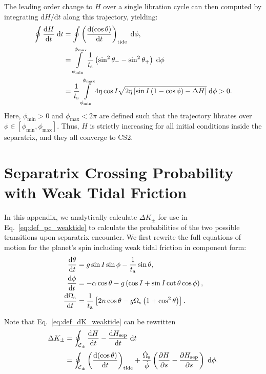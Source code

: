 \documentclass[
        fleqn,
        usenatbib,
    ]{mnras}
\newcommand*{\rd}[2]{\frac{\mathrm{d}#1}{\mathrm{d}#2}}
\newcommand*{\pd}[2]{\frac{\partial#1}{\partial#2}}
\newcommand*{\rdil}[2]{\mathrm{d}#1/\mathrm{d}#2}
\newcommand*{\p}[1]{\left(#1\right)}
\newcommand*{\s}[1]{\left[#1\right]}
\begin{document}
The leading order change to $H$ over a single libration cycle can then computed by
integrating $\rdil{H}{t}$ along this trajectory, yielding:
\begin{align}
    \oint \rd{H}{t}\;\mathrm{d}t
        &= \oint \p{\rd{(\cos \theta)}{t}}_{\rm tide}
            \;\mathrm{d}\phi,\nonumber\\
        &= \int\limits_{\phi_{\min}}^{\phi_{\max}}
                \frac{1}{t_{\rm s}}
                \p{\sin^2\theta_- - \sin^2\theta_+} \;\mathrm{d}\phi\nonumber\\
        &= \frac{1}{t_{\rm s}}
            \int\limits_{\phi_{\min}}^{\phi_{\max}}
                4\eta \cos I \sqrt{2\eta\s{\sin I\p{1 - \cos \phi} - \Delta H}}
                \;\mathrm{d}\phi > 0.
\end{align}
Here, $\phi_{\min} > 0$ and $\phi_{\max} < 2\pi$ are defined such that the
trajectory librates over $\phi \in \s{\phi_{\min}, \phi_{\max}}$. Thus, $H$ is
strictly increasing for all initial conditions inside the separatrix, and they
all converge to CS2.

\section{Separatrix Crossing Probability with Weak Tidal Friction
}\label{app:sep_crossing_dynamics}

In this appendix, we analytically calculate $\Delta K_{\pm}$ for use in
Eq.~\eqref{eq:def_pc_weaktide} to calculate the probabilities of the two
possible transitions upon separatrix encounter. We first rewrite the full
equations of motion for the planet's spin including weak tidal friction in
component form:
\begin{align}
    \rd{\theta}{t} &= g\sin I \sin \phi -
        \frac{1}{t_{\rm a}} \sin \theta,\label{eq:ds_fullq}\\
    \rd{\phi}{t} &= -\alpha\cos\theta
        - g\p{\cos I + \sin I \cot \theta \cos \phi}\label{eq:ds_fullphi},\\
    \rd{\Omega_{\rm s}}{t}
        &= \frac{1}{t_{\rm a}} \s{2n \cos \theta
            - g\Omega_{\rm s}\p{1 + \cos^2\theta}}\label{eq:ds_fulls}.
\end{align}

Note that Eq.~\eqref{eq:def_dK_weaktide} can be rewritten
\begin{align}
    \Delta K_{\pm} &= \oint_{\mathcal{C}_{\pm}} \rd{H}{t}
        - \rd{H_{\rm sep}}{t}\;\mathrm{d}t
        \nonumber\\
        &= \oint_{\mathcal{C}_{\pm}}
           \p{\rd{(\cos\theta)}{t}}_{\rm tide}
            + \frac{\dot{\Omega}_{\rm s}}{\dot{\phi}}
            \p{\pd{H}{s} - \pd{H_{\rm sep}}{s}}\;\mathrm{d}\phi
                \label{eq:app_dhpm}.
\end{align}
\end{document}

